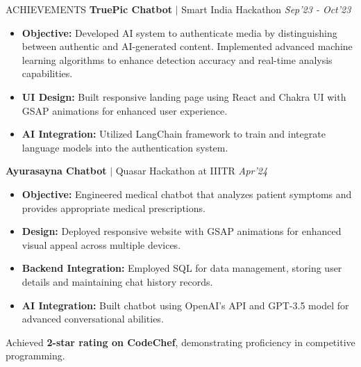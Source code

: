 \documentclass{resume} %
\begin{document}
\vspace{-3.3em}
\begin{rSection}{ACHIEVEMENTS}
\hspace*{0.1cm}
\textbf{TruePic Chatbot} $|$ Smart India Hackathon \hfill \textit{Sep'23 - Oct'23} \hspace{0.5em} \href{https://github.com/iiit-dev/TruePic}{\Large\faGithub}
\begin{itemize}
    \item \textbf{Objective:} Developed AI system to authenticate media by distinguishing between authentic and AI-generated content. Implemented advanced machine learning algorithms to enhance detection accuracy and real-time analysis capabilities.
    \item \textbf{UI Design:} Built responsive landing page using React and Chakra UI with GSAP animations for enhanced user experience.
     \item \textbf{AI Integration:} Utilized LangChain framework to train and integrate language models into the authentication system.
\end{itemize}  

\hspace*{0.1cm}
\textbf{Ayurasayna Chatbot} $|$ Quasar Hackathon at IIITR \hfill \textit{Apr'24}
\begin{itemize}
\item \textbf{Objective:} Engineered medical chatbot that analyzes patient symptoms and provides appropriate medical prescriptions.
    \item \textbf{Design:} Deployed responsive website with GSAP animations for enhanced visual appeal across multiple devices.
    \item \textbf{Backend Integration:} Employed SQL for data management, storing user details and maintaining chat history records.
    \item \textbf{AI Integration:} Built chatbot using OpenAI's API and GPT-3.5 model for advanced conversational abilities.
\end{itemize}  
Achieved \textbf{2-star rating on CodeChef}, demonstrating proficiency in competitive programming.
\end{rSection}
\vspace{-1em}
\vspace{-1.2em}
\end{document}
